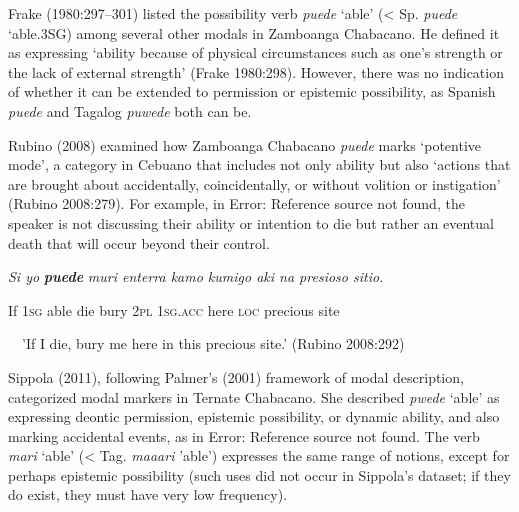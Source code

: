\begin{styleStandard}
Frake (1980:297–301) listed the possibility verb \textit{puede} ‘able’ ({\textless} Sp. \textit{puede} ‘able.3SG) among several other modals in Zamboanga Chabacano. He defined it as expressing ‘ability because of physical circumstances such as one’s strength or the lack of external strength’ (Frake 1980:298). However, there was no indication of whether it can be extended to permission or epistemic possibility, as Spanish \textit{puede} and Tagalog \textit{puwede} both can be. 
\end{styleStandard}

\begin{styleStandard}
Rubino (2008) examined how Zamboanga Chabacano \textit{puede} marks ‘potentive mode’, a category in Cebuano that includes not only ability but also ‘actions that are brought about accidentally, coincidentally, or without volition or instigation’ (Rubino 2008:279). For example, in Error: Reference source not found, the speaker is not discussing their ability or intention to die but rather an eventual death that will occur beyond their control.
\end{styleStandard}


\setcounter{listWWNumiileveli}{0}
\begin{listWWNumiileveli}
\item 
\begin{stylelsLanginfo}
\textit{Si yo }\textbf{\textit{puede}}\textit{ muri enterra kamo kumigo aki na presioso sitio.}
\end{stylelsLanginfo}
\end{listWWNumiileveli}
\begin{stylelsIMT}
If 1\textsc{sg} able die bury 2\textsc{pl} \textsc{1sg.acc} here \textsc{loc} precious site 
\end{stylelsIMT}

\begin{stylelsIMT}
\ \ {}'If I die, bury me here in this precious site.' (Rubino 2008:292)
\end{stylelsIMT}

\begin{styleStandard}
Sippola (2011), following Palmer's (2001) framework of modal description, categorized modal markers in Ternate Chabacano. She described \textit{pwede} ‘able’ as expressing deontic permission, epistemic possibility, or dynamic ability, and also marking accidental events, as in Error: Reference source not found. The verb \textit{mari} ‘able’ ({\textless} Tag. \textit{maaari} 'able') expresses the same range of notions, except for perhaps epistemic possibility (such uses did not occur in Sippola's dataset; if they do exist, they must have very low frequency).
\end{styleStandard}

